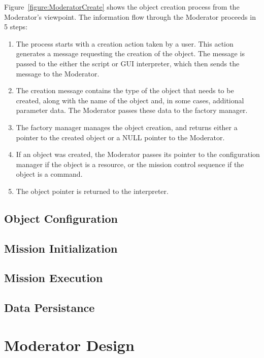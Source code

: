 Figure~\ref{figure:ModeratorCreate} shows the object creation process from the Moderator's
viewpoint.  The information flow through the Moderator proceeds in 5 steps:

\begin{enumerate}
\item The process starts with a creation action taken by a user.  This action generates a message
requesting the creation of the object.  The message is passed to the either the script or GUI
interpreter, which then sends the message to the Moderator.
\item The creation message contains the type of the object that needs to be created, along with the
name of the object and, in some cases, additional parameter data.  The Moderator passes these data
to the factory manager.
\item The factory manager manages the object creation, and returns either a pointer to the created
object or a NULL pointer to the Moderator.
\item If an object was created, the Moderator passes its pointer to the configuration manager if the
object is a resource, or the mission control sequence if the object is a command.
\item The object pointer is returned to the interpreter.
\end{enumerate}

\subsection{Object Configuration}



\subsection{Mission Initialization}



\subsection{Mission Execution}



\subsection{Data Persistance}



\section{Moderator Design}

